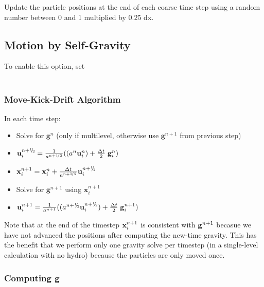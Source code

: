 \noindent Update the particle positions at the end of each coarse time step using a 
random number between 0 and 1 multiplied by 0.25 dx.

\subsection{Motion by Self-Gravity}

\noindent To enable this option, set \\

 \\

\subsubsection{Move-Kick-Drift Algorithm}

In each time step:
\begin{itemize}
\item Solve for ${\mathbf g}^n$  (only if multilevel, otherwise use ${\mathbf g}^{n+1}$ from previous step)
\item ${\mathbf u}_i^{\nph} = \frac{1}{a^{\nph}} ( (a^n {\mathbf u}^n_i) + \frac{\dt}{2} \; {\mathbf g}^n_i )$
\item ${\mathbf x}_i^{n+1 } = {\mathbf x}^n_i +  \frac{\dt}{a^{\nph}}  {\mathbf u}_i^{\nph}$
\item Solve for ${\mathbf g}^{n+1}$ using ${\mathbf x}_i^{n+1}$
\item ${\mathbf u}_i^{n+1} = \frac{1}{a^{n+1}} ( (a^{\nph} {\mathbf u}^{\nph}_i) + \frac{\dt}{2} \; {\mathbf g}^{n+1}_i )$
\end{itemize}

Note that at the end of the timestep ${\bf x}_i^{n+1}$ is consistent with ${\bf g}^{n+1}$ becasue
we have not advanced the positions after computing the new-time gravity.  This has the benefit that
we perform only one gravity solve per timestep (in a single-level calculation with no hydro) because
the particles are only moved once.

\subsubsection{Computing {\bf g}}

